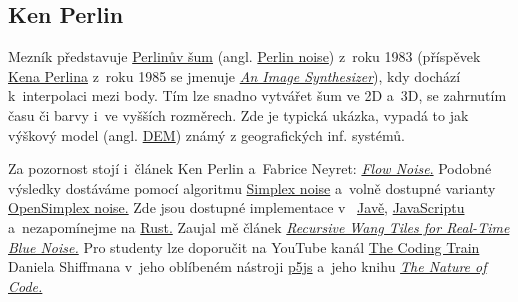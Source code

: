 \newdimen\vyska \vyska=18mm
\noindent
{}\hfill
{}\hfill
{}\hfill
{}\hfill
{}\hfill
{}%



\subsection{Ken Perlin}
Mezník představuje \href{https://cs.wikipedia.org/wiki/Perlin%C5%AFv_%C5%A1um}{Perlinův šum} (angl. 
\href{https://en.wikipedia.org/wiki/Perlin_noise}{Perlin noise}) z~roku 1983 (příspěvek 
\href{https://mrl.nyu.edu/~perlin/}{Kena Perlina} z~roku 1985 se jmenuje 
\href{http://citeseerx.ist.psu.edu/viewdoc/download?doi=10.1.1.220.2248&rep=rep1&type=pdf}{\emph{An Image Synthesizer}}), kdy dochází k~interpolaci mezi body. Tím lze snadno vytvářet šum ve 2D a~3D, se zahrnutím času či barvy i~ve vyšších rozměrech. Zde je typická ukázka, vypadá to jak výškový model (angl. 
\href{https://en.wikipedia.org/wiki/Digital_elevation_model}{DEM}) známý z geografických inf. systémů.

\noindent
{}


Za pozornost stojí i~článek Ken Perlin a~Fabrice Neyret: \href{http://evasion.imag.fr/Publications/2001/PN01/}{\emph{Flow Noise}.} Podobné výsledky dostáváme pomocí 
algoritmu \href{https://en.wikipedia.org/wiki/Simplex_noise}{Simplex noise} a~volně dostupné varianty 
\href{https://en.wikipedia.org/wiki/OpenSimplex_noise}{OpenSimplex noise.} 
Zde jsou dostupné implementace v~%
\href{https://gist.github.com/KdotJPG/b1270127455a94ac5d19}{Javě},
\href{https://www.npmjs.com/package/open-simplex-noise}{JavaScriptu} a~nezapomínejme na
\href{https://crates.io/crates/noise}{Rust.} Zaujal mě článek 
\href{http://johanneskopf.de/publications/blue_noise/}{\textit{Recursive Wang Tiles for Real-Time Blue Noise.}}
Pro studenty lze doporučit na YouTube kanál 
\href{https://www.youtube.com/playlist?list=PLRqwX-V7Uu6bgPNQAdxQZpJuJCjeOr7VD}{The Coding Train} Daniela Shiffmana
v~jeho oblíbeném nástroji 
\href{https://p5js.org/}{\url{p5js}} 
a~jeho knihu 
\href{https://natureofcode.com/}{\emph{The Nature of Code.}}

